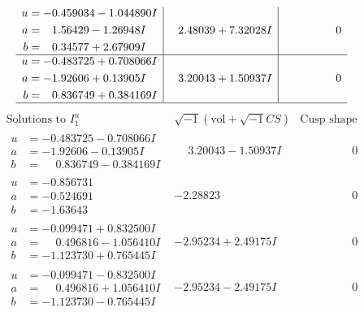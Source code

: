 \documentclass[1p]{elsarticle_modified}
\theoremstyle{definition}
\newcommand{\I}{\sqrt{-1}}
\begin{document}
$$\begin{array}{c|c|c}
\begin{aligned}
u &= -0.459034 - 1.044890 I \\
a &= \phantom{-}1.56429 - 1.26948 I \\
b &= \phantom{-}0.34577 + 2.67909 I\end{aligned}
 & \phantom{-}2.48039 + 7.32028 I & \phantom{-0.000000 } 0 \\ \hline\begin{aligned}
u &= -0.483725 + 0.708066 I \\
a &= -1.92606 + 0.13905 I \\
b &= \phantom{-}0.836749 + 0.384169 I\end{aligned}
 & \phantom{-}3.20043 + 1.50937 I & \phantom{-0.000000 } 0\\
 \hline 
 \end{array}$$\newpage$$\begin{array}{c|c|c}  
\text{Solutions to }I^u_{1}& \I (\text{vol} + \sqrt{-1}CS) & \text{Cusp shape}\\
 \hline 
\begin{aligned}
u &= -0.483725 - 0.708066 I \\
a &= -1.92606 - 0.13905 I \\
b &= \phantom{-}0.836749 - 0.384169 I\end{aligned}
 & \phantom{-}3.20043 - 1.50937 I & \phantom{-0.000000 } 0 \\ \hline\begin{aligned}
u &= -0.856731\phantom{ +0.000000I} \\
a &= -0.524691\phantom{ +0.000000I} \\
b &= -1.63643\phantom{ +0.000000I}\end{aligned}
 & -2.28823\phantom{ +0.000000I} & \phantom{-0.000000 } 0 \\ \hline\begin{aligned}
u &= -0.099471 + 0.832500 I \\
a &= \phantom{-}0.496816 - 1.056410 I \\
b &= -1.123730 + 0.765445 I\end{aligned}
 & -2.95234 + 2.49175 I & \phantom{-0.000000 } 0 \\ \hline\begin{aligned}
u &= -0.099471 - 0.832500 I \\
a &= \phantom{-}0.496816 + 1.056410 I \\
b &= -1.123730 - 0.765445 I\end{aligned}
 & -2.95234 - 2.49175 I & \phantom{-0.000000 } 0 \\ \hline\begin{aligned}

\end{aligned}
\end{array}$$
\end{document}
